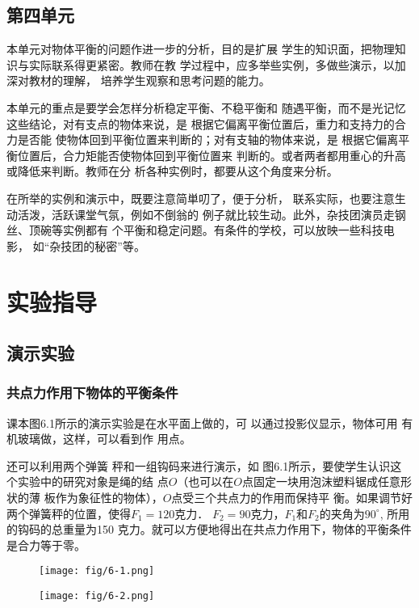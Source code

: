 \subsection{第四单元}
本单元对物体平衡的问题作进一步的分析，目的是扩展
学生的知识面，把物理知识与实际联系得更紧密。教师在教
学过程中，应多举些实例，多做些演示，以加深对教材的理解，
培养学生观察和思考问题的能力。

本单元的重点是要学会怎样分析稳定平衡、不稳平衡和
随遇平衡，而不是光记忆这些结论，对有支点的物体来说，是
根据它偏离平衡位置后，重力和支持力的合力是否能
使物体回到平衡位置来判断的；对有支轴的物体来说，是
根据它偏离平衡位置后，合力矩能否使物体回到平衡位置来
判断的。或者两者都用重心的升高或降低来判断。教师在分
析各种实例时，都要从这个角度来分析。

在所举的实例和演示中，既要注意简単叨了，便于分析，
联系实际，也要注意生动活泼，活跃课堂气氛，例如不倒翁的
例子就比较生动。此外，杂技团演员走钢丝、顶碗等实例都有
个平衡和稳定问题。有条件的学校，可以放映一些科技电影，
如“杂技团的秘密”等。

\section{实验指导}
\subsection{演示实验}
\subsubsection{共点力作用下物体的平衡条件}
课本图6.1所示的演示实验是在水平面上做的，可
以通过投影仪显示，物体可用
有机玻璃做，这样，可以看到作
用点。


还可以利用两个弹簧
秤和一组钩码来进行演示，如
图6.1所示，要使学生认识这
个实验中的研究对象是绳的结
点$O$（也可以在$O$点固定一块用泡沫塑料锯成任意形状的薄
板作为象征性的物体），$O$点受三个共点力的作用而保持平
衡。如果调节好两个弹簧秤的位置，使得$F_1=120$克力．
$F_2=90$克力，$F_1$和$F_2$的夹角为$90^{\circ}$, 所用的钩码的总重量为150
克力。就可以方便地得出在共点力作用下，物体的平衡条件
是合力等于零。

\begin{figure}[htp]\centering
    \begin{minipage}[t]{0.48\textwidth}
    \centering
    \texttt{[image: fig/6-1.png]}
    \caption{}
    \end{minipage}
    \begin{minipage}[t]{0.48\textwidth}
    \centering
    \texttt{[image: fig/6-2.png]}
    \caption{}
    \end{minipage}
    \end{figure}

